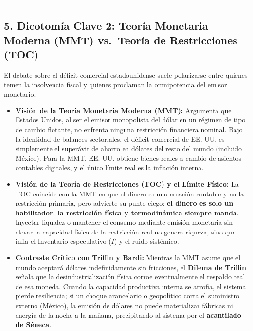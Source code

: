 \documentclass[12pt,letterpaper]{article}
\providecommand{\tightlist}{%
  \setlength{\itemsep}{0pt}\setlength{\parskip}{0pt}}
\begin{document}
\begin{center}\rule{0.5\linewidth}{0.5pt}\end{center}

\hypertarget{dicotomuxeda-clave-2-teoruxeda-monetaria-moderna-mmt-vs.-teoruxeda-de-restricciones-toc}{%
\subsection{5. Dicotomía Clave 2: Teoría Monetaria Moderna (MMT)
vs.~Teoría de Restricciones
(TOC)}\label{dicotomuxeda-clave-2-teoruxeda-monetaria-moderna-mmt-vs.-teoruxeda-de-restricciones-toc}}

El debate sobre el déficit comercial estadounidense suele polarizarse
entre quienes temen la insolvencia fiscal y quienes proclaman la
omnipotencia del emisor monetario.

\begin{itemize}
\tightlist
\item
  \textbf{Visión de la Teoría Monetaria Moderna (MMT):} Argumenta que
  Estados Unidos, al ser el emisor monopolista del dólar en un régimen
  de tipo de cambio flotante, no enfrenta ninguna restricción financiera
  nominal. Bajo la identidad de balances sectoriales, el déficit
  comercial de EE. UU. es simplemente el superávit de ahorro en dólares
  del resto del mundo (incluido México). Para la MMT, EE. UU. obtiene
  bienes reales a cambio de asientos contables digitales, y el único
  límite real es la inflación interna.
\item
  \textbf{Visión de la Teoría de Restricciones (TOC) y el Límite
  Físico:} La TOC coincide con la MMT en que el dinero es una creación
  contable y no la restricción primaria, pero advierte su punto ciego:
  \textbf{el dinero es solo un habilitador; la restricción física y
  termodinámica siempre manda}. Inyectar liquidez o mantener el consumo
  mediante emisión monetaria sin elevar la capacidad física de la
  restricción real no genera riqueza, sino que infla el Inventario
  especulativo (\(I\)) y el ruido sistémico.
\item
  \textbf{Contraste Crítico con Triffin y Bardi:} Mientras la MMT asume
  que el mundo aceptará dólares indefinidamente sin fricciones, el
  \textbf{Dilema de Triffin} señala que la desindustrialización física
  corroe eventualmente el respaldo real de esa moneda. Cuando la
  capacidad productiva interna se atrofia, el sistema pierde
  resiliencia; si un choque arancelario o geopolítico corta el
  suministro externo (México), la emisión de dólares no puede
  materializar fábricas ni energía de la noche a la mañana, precipitando
  al sistema por el \textbf{acantilado de Séneca}.
\end{itemize}
\end{document}
